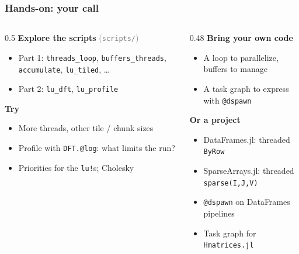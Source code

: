 \documentclass{beamer}
\begin{document}
\begin{frame}
	\frametitle{Hands-on: your call}
	\begin{columns}[T]
		\begin{column}{0.5\textwidth}
			\textbf{Explore the scripts} \textcolor{gray}{(\texttt{scripts/})}
			\small
			\begin{itemize}
				\item Part 1: \texttt{threads\_loop}, \texttt{buffers\_threads}, \texttt{accumulate}, \texttt{lu\_tiled}, \ldots
				\item Part 2: \texttt{lu\_dft}, \texttt{lu\_profile}
			\end{itemize}
			\normalsize
			\textbf{Try}
			\small
			\begin{itemize}
				\item More threads, other tile / chunk sizes
				\item Profile with \texttt{DFT.@log}: what limits the run?
				\item Priorities for the \texttt{lu!}s; Cholesky
			\end{itemize}
		\end{column}
		\begin{column}{0.48\textwidth}
			\textbf{Bring your own code}
			\small
			\begin{itemize}
				\item A loop to parallelize, buffers to manage
				\item A task graph to express with \texttt{@dspawn}
			\end{itemize}
			\normalsize
			\textbf{Or a project}
			\small
			\begin{itemize}
				\item DataFrames.jl: threaded \texttt{ByRow}
				\item SparseArrays.jl: threaded \texttt{sparse(I,J,V)}
				\item \texttt{@dspawn} on DataFrames pipelines
				\item Task graph for \texttt{Hmatrices.jl}
			\end{itemize}
		\end{column}
	\end{columns}

\end{frame}
\end{document}
